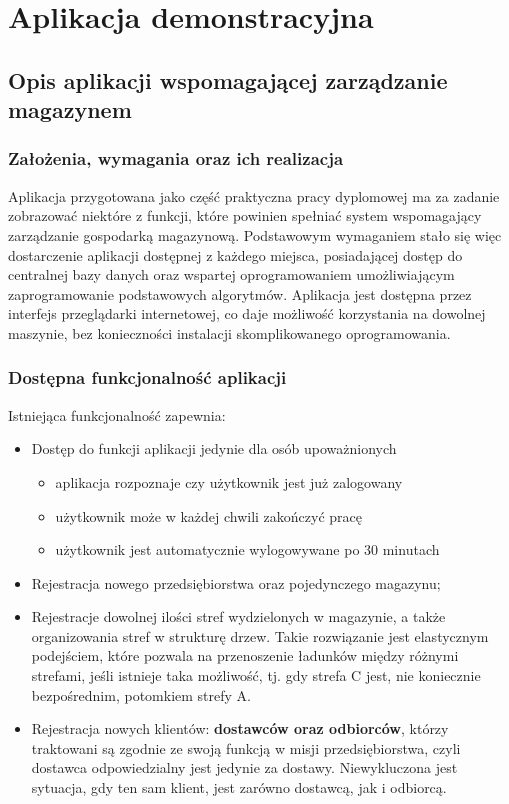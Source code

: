 \chapter{Aplikacja demonstracyjna}
\label{c6:c6}

\section{Opis aplikacji wspomagającej zarządzanie magazynem}
	\subsection{Założenia, wymagania oraz ich realizacja}
		Aplikacja przygotowana jako część praktyczna pracy dyplomowej ma za zadanie
		zobrazować niektóre z funkcji, które powinien spełniać system wspomagający
		zarządzanie gospodarką magazynową. Podstawowym wymaganiem stało się więc
		dostarczenie aplikacji dostępnej z każdego miejsca, posiadającej dostęp
		do centralnej bazy danych oraz wspartej oprogramowaniem umożliwiającym
		zaprogramowanie podstawowych algorytmów. Aplikacja jest dostępna przez interfejs przeglądarki
		internetowej, co daje możliwość korzystania na dowolnej maszynie, bez konieczności
		instalacji skomplikowanego oprogramowania. 
	\subsection{Dostępna funkcjonalność aplikacji}
		Istniejąca funkcjonalność zapewnia:
		\begin{itemize}
			\item Dostęp do funkcji aplikacji jedynie dla osób upoważnionych
			\begin{itemize}
				\item aplikacja rozpoznaje czy użytkownik jest już zalogowany
				\item użytkownik może w każdej chwili zakończyć pracę
				\item użytkownik jest automatycznie wylogowywane po 30 minutach 
			\end{itemize}
			\item Rejestracja nowego przedsiębiorstwa oraz pojedynczego magazynu;
			\item Rejestracje dowolnej ilości stref wydzielonych w magazynie, a także organizowania
			stref w strukturę drzew. Takie rozwiązanie jest elastycznym podejściem, które
			pozwala na przenoszenie ładunków między różnymi strefami, jeśli istnieje taka możliwość, tj.
			gdy strefa C jest, nie koniecznie bezpośrednim, potomkiem strefy A.
			\item Rejestracja nowych klientów: \textbf{dostawców oraz odbiorców}, którzy traktowani są
			zgodnie ze swoją funkcją w misji przedsiębiorstwa, czyli dostawca odpowiedzialny jest
			jedynie za dostawy. Niewykluczona jest sytuacja, gdy ten sam klient, jest zarówno dostawcą, jak
			i odbiorcą. 
		\end{itemize}
